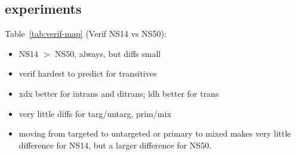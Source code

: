 \subsection{ experiments}
\label{sec:map-verif}

Table~\ref{tab:verif-map} (Verif NS14 vs NS50):
\begin{itemize}
\item NS14 $>$ NS50, always, but diffs small
\item verif hardest to predict for transitives
\item xdx better for intrans and ditrans; ldh better for trans
\item very little diffs for targ/untarg, prim/mix
\item moving from targeted to untargeted or primary to mixed makes very little difference for NS14, but a larger difference for NS50.
\end{itemize}

